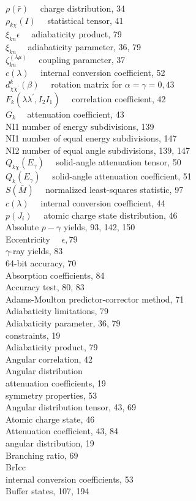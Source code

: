 \documentclass[10pt]{article}
\begin{document}
$\rho(\bar{r}) \quad$ charge distribution, 34\\
$\rho_{k \chi}(I) \quad$ statistical tensor, 41\\
$\xi_{k n} \epsilon \quad$ adiabaticity product, 79\\
$\xi_{k n} \quad$ adiabaticity parameter, 36, 79\\
$\zeta_{k n}^{(\lambda \mu)} \quad$ coupling parameter, 37\\
$c(\lambda) \quad$ internal conversion coefficient, 52\\
$d_{\chi \chi^{\prime}}^{k}(\beta) \quad$ rotation matrix for $\alpha=\gamma=0,43$\\
$F_{k}\left(\lambda \lambda^{\prime}, I_{2} I_{1}\right) \quad$ correlation coefficient, 42\\
$G_{k} \quad$ attenuation coefficient, 43\\
NI1 number of energy subdivisions, 139\\
NI1 number of equal energy subdivisions, 147\\
NI2 number of equal angle subdivisions, 139, 147\\
$Q_{k \chi}\left(E_{\gamma}\right) \quad$ solid-angle attenuation tensor, 50\\
$Q_{k}\left(E_{\gamma}\right) \quad$ solid-angle attenuation coefficient, 51\\
$S(\bar{M}) \quad$ normalized least-squares statistic, 97\\
$c(\lambda) \quad$ internal conversion coefficient, 44\\
$p\left(J_{i}\right) \quad$ atomic charge state distribution, 46\\
Absolute $p-\gamma$ yields, 93, 142, 150\\
Eccentricity $\quad \epsilon, 79$\\
$\gamma$-ray yields, 83\\
64-bit accuracy, 70\\
Absorption coefficients, 84\\
Accuracy test, 80, 83\\
Adams-Moulton predictor-corrector method, 71\\
Adiabaticity limitations, 79\\
Adiabaticity parameter, 36, 79\\
constraints, 19\\
Adiabaticity product, 79\\
Angular correlation, 42\\
Angular distribution\\
attenuation coefficients, 19\\
symmetry properties, 53\\
Angular distribution tensor, 43, 69\\
Atomic charge state, 46\\
Attenuation coefficient, 43, 84\\
angular distribution, 19\\
Branching ratio, 69\\
BrIcc\\
internal conversion coefficients, 53\\
Buffer states, 107, 194
\end{document}
